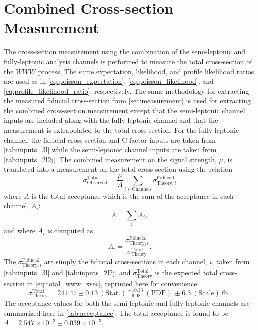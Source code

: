 \section{Combined Cross-section Measurement}
\label{sec:combined_measurement}

The cross-section measurement using the combination of the semi-leptonic
and fully-leptonic analysis channels is performed to 
measure the total cross-section of the $WWW$ process. 
The same expectation, likelihood, and profile likelihood
ratios are used as in \eqn\eqref{eq:poisson_expectation},
\eqn\eqref{eq:poisson_likelihood}, and
\eqn\eqref{eq:profile_likelihood_ratio}, respectively.
The same methodology for extracting the measured fiducial
cross-section from
\sec\ref{sec:measurement} is used for extracting the combined
cross-section measurement except that the semi-leptonic channel
inputs are included along with the fully-leptonic channel
and that the measurement is extrapolated to the total
cross-section.
For the fully-leptonic channel,
the fiducial cross-section and C-factor inputs 
are taken from \tab\ref{tab:inputs_3l}
while the semi-leptonic channel inputs are taken from 
\tab\ref{tab:inputs_2l2j}.
The combined measurement on the signal strength, $\mu$, is translated
into a measurement on the total cross-section using the relation
\begin{equation}
\sigma^{\textrm{Total}}_{\textrm{Observed}} = \frac{\mu}{A} \sum_{i\in \textrm{Channels}} \sigma^{\textrm{Fiducial}}_{\textrm{Theory},i}
\label{eq:sigmatot}
\end{equation}
where $A$ is the total acceptance which is the sum of the 
acceptance in each channel, $A_i$:
\begin{equation}
A = \sum_i A_i, 
\end{equation}
and where $A_i$ is computed as
\begin{equation}
A_i = \frac{ \sigma^{\textrm{Fiducial}}_{\textrm{Theory},i} }{ \sigma^{\textrm{Total}}_{\textrm{Theory}}}.
\end{equation}
The $\sigma^{\textrm{Fiducial}}_{\textrm{Theory},i} $ are simply the fiducial
cross-sections in each channel, $i$,  taken from
\tab\ref{tab:inputs_3l} and \tab\ref{tab:inputs_2l2j}
and $\sigma^{\textrm{Total}}_{\textrm{Theory}}$ is the expected total cross-section
in \eqn\eqref{eq:total_www_xsec}, reprinted here for convenience:
\begin{equation}
\sigma^{\textrm{Total}}_{\textrm{Theory}}= 241.47\pm0.13 ~(\textrm{Stat.}) ~^{+10.33}_{-6.08} ~(\textrm{PDF}) ~\pm 6.3 ~(\textrm{Scale}) ~\textrm{fb} ~.
\end{equation}
The acceptance values for both the semi-leptonic and fully-leptonic channels 
are summarized here in \tab\ref{tab:acceptance}.
The total acceptance is found to be $A = 2.547 \times 10^{-3} \pm 0.039 \times 10^{-3}$.


